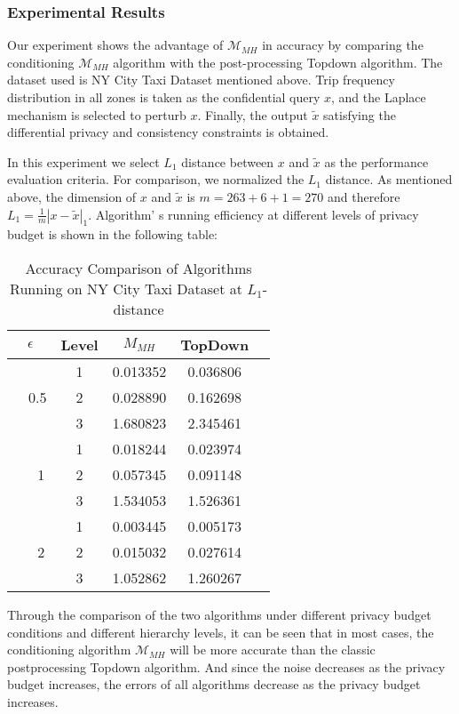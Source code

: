 \documentclass[11pt]{article}
\begin{document}
\subsubsection{Experimental Results}

Our experiment shows the advantage of $\mathcal{M}_{M H}$ in accuracy by comparing the conditioning $\mathcal{M}_{M H}$ algorithm with the post-processing Topdown algorithm.
The dataset used is NY City Taxi Dataset mentioned above. Trip frequency distribution in all zones is taken as the confidential query $x$, and the Laplace mechanism is selected to perturb $x$. Finally, the output $\tilde{x}$ satisfying the differential privacy and consistency constraints is obtained.

In this experiment we select $L_{1}$ distance between $x$ and $\tilde{x}$ as the performance evaluation criteria. For comparison, we normalized the $L_{1}$ distance. As mentioned above, the dimension of $x$ and $\tilde{x}$ is $m=263+6+1=270$ and therefore $L_{1}=\frac{1}{m}|x-\tilde{x}|_{1}$. Algorithm' s running efficiency at different levels of privacy budget is shown in the following table:

\begin{table}[htbp]
\begin{center}
 \caption{Accuracy Comparison of Algorithms Running on NY City Taxi Dataset at $L_1$-distance}
\begin{tabular}{ |c|c|c|c| c| } 
\hline
$\epsilon$ & Level & $M_{MH}$  & TopDown \\
\hline
\multirow{3}{4em}{\quad\ \ 0.5} & 1 &0.013352& 0.036806 \\ 
& 2 & 0.028890 & 0.162698 \\ 
& 3 & 1.680823 & 2.345461 \\ 
\hline
\multirow{3}{4em}{\quad\ \ \ 1} & 1 & 0.018244 & 0.023974 \\ 
& 2 &0.057345 & 0.091148 \\ 
& 3 & 1.534053 & 1.526361 \\
\hline
\multirow{3}{4em}{\quad\ \ \ 2} & 1  & 0.003445 & 0.005173 \\ 
& 2 & 0.015032 & 0.027614 \\ 
& 3 & 1.052862 & 1.260267\\
\hline
\end{tabular}
\label{comparison-results}
\end{center}
\end{table}


Through the comparison of the two algorithms under different privacy budget conditions and different hierarchy levels, it can be seen that in most cases, the conditioning algorithm $\mathcal{M}_{M H}$ will be more accurate than the classic postprocessing Topdown algorithm. And since the noise decreases as the privacy budget increases, the errors of all algorithms decrease as the privacy budget increases. 

% 
% 
\end{document}
